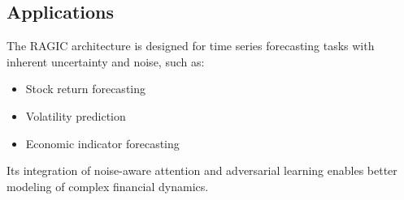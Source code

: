 \subsection{Applications}

The RAGIC architecture is designed for time series forecasting tasks with inherent uncertainty and noise, such as:
\begin{itemize}
    \item Stock return forecasting
    \item Volatility prediction
    \item Economic indicator forecasting
\end{itemize}

Its integration of noise-aware attention and adversarial learning enables better modeling of complex financial dynamics.

